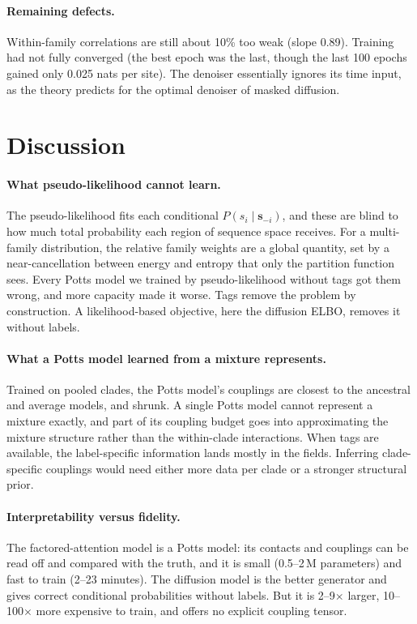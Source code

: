 \documentclass[10pt,a4paper,twocolumn]{article}
\begin{document}
\paragraph{Remaining defects.} Within-family correlations are still about 10\% too weak (slope 0.89). Training had not
fully converged (the best epoch was the last, though the last 100 epochs gained only 0.025 nats per site). The
denoiser essentially ignores its time input, as the theory predicts for the optimal denoiser of masked diffusion.

\section{Discussion}
\paragraph{What pseudo-likelihood cannot learn.} The pseudo-likelihood fits each conditional $P(s_i\mid\bm s_{-i})$,
and these are blind to how much total probability each region of sequence space receives. For a multi-family
distribution, the relative family weights are a global quantity, set by a near-cancellation between energy and
entropy that only the partition function sees. Every Potts model we trained by pseudo-likelihood without tags got them
wrong, and more capacity made it worse. Tags remove the problem by construction. A likelihood-based objective, here
the diffusion ELBO, removes it without labels.

\paragraph{What a Potts model learned from a mixture represents.} Trained on pooled clades, the Potts model's couplings
are closest to the ancestral and average models, and shrunk. A single Potts model cannot represent a mixture exactly,
and part of its coupling budget goes into approximating the mixture structure rather than the within-clade
interactions. When tags are available, the label-specific information lands mostly in the fields. Inferring
clade-specific couplings would need either more data per clade or a stronger structural prior.

\paragraph{Interpretability versus fidelity.} The factored-attention model is a Potts model: its contacts and
couplings can be read off and compared with the truth, and it is small (0.5--2\,M parameters) and fast to train
(2--23 minutes). The diffusion model is the better generator and gives correct conditional probabilities without
labels. But it is 2--9$\times$ larger, 10--100$\times$ more expensive to train, and offers no explicit coupling
tensor.
\end{document}
